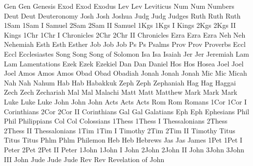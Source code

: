 \BookTitle Gen    Gen          {Genesis}
\BookTitle Exod   Exod         {Exodus}
\BookTitle Lev    Lev          {Leviticus}
\BookTitle Num    Num          {Numbers}
\BookTitle Deut   Deut         {Deuteronomy}
\BookTitle Josh   Josh         {Joshua}
\BookTitle Judg   Judg         {Judges}
\BookTitle Ruth   Ruth         {Ruth}
\BookTitle 1Sam   1Sam         {I Samuel}
\BookTitle 2Sam   2Sam         {II Samuel}
\BookTitle 1Kgs   1Kgs         {I Kings}
\BookTitle 2Kgs   2Kgs         {II Kings}
\BookTitle 1Chr   1Chr         {I Chronicles}
\BookTitle 2Chr   2Chr         {II Chronicles}
\BookTitle Ezra   Ezra         {Ezra}
\BookTitle Neh    Neh          {Nehemiah}
\BookTitle Esth   Esth         {Esther}
\BookTitle Job    Job          {Job}
\BookTitle Ps     Ps           {Psalms}
\BookTitle Prov   Prov         {Proverbs}
\BookTitle Eccl   Eccl         {Ecclesiastes}
\BookTitle Song   Song         {Song of Solomon}
\BookTitle Isa    Isa          {Isaiah}
\BookTitle Jer    Jer          {Jeremiah}
\BookTitle Lam    Lam          {Lamentations}
\BookTitle Ezek   Ezek         {Ezekiel}
\BookTitle Dan    Dan          {Daniel}
\BookTitle Hos    Hos          {Hosea}
\BookTitle Joel   Joel         {Joel}
\BookTitle Amos   Amos         {Amos}
\BookTitle Obad   Obad         {Obadiah}
\BookTitle Jonah  Jonah        {Jonah}
\BookTitle Mic    Mic          {Micah}
\BookTitle Nah    Nah          {Nahum}
\BookTitle Hab    Hab          {Habakkuk}
\BookTitle Zeph   Zeph         {Zephaniah}
\BookTitle Hag    Hag          {Haggai}
\BookTitle Zech   Zech         {Zechariah}
\BookTitle Mal    Mal          {Malachi}
\BookTitle Matt   Matt         {Matthew}
\BookTitle Mark   Mark         {Mark}
\BookTitle Luke   Luke         {Luke}
\BookTitle John   John         {John}
\BookTitle Acts   Acts         {Acts}
\BookTitle Rom    Rom          {Romans}
\BookTitle 1Cor   1Cor         {I Corinthians}
\BookTitle 2Cor   2Cor         {II Corinthians}
\BookTitle Gal    Gal          {Galatians}
\BookTitle Eph    Eph          {Ephesians}
\BookTitle Phil   Phil         {Philippians}
\BookTitle Col    Col          {Colossians}
\BookTitle 1Thess 1Thess       {I Thessalonians}
\BookTitle 2Thess 2Thess       {II Thessalonians}
\BookTitle 1Tim   1Tim         {I Timothy}
\BookTitle 2Tim   2Tim         {II Timothy}
\BookTitle Titus  Titus        {Titus}
\BookTitle Phlm   Phlm         {Philemon}
\BookTitle Heb    Heb          {Hebrews}
\BookTitle Jas    Jas          {James}
\BookTitle 1Pet   1Pet         {I Peter}
\BookTitle 2Pet   2Pet         {II Peter}
\BookTitle 1John  1John        {I John}
\BookTitle 2John  2John        {II John}
\BookTitle 3John  3John        {III John}
\BookTitle Jude   Jude         {Jude}
\BookTitle Rev    Rev          {Revelation of John}
\def\nochapbooks{Obad Phlm 2John 3John Jude}
\endinput
